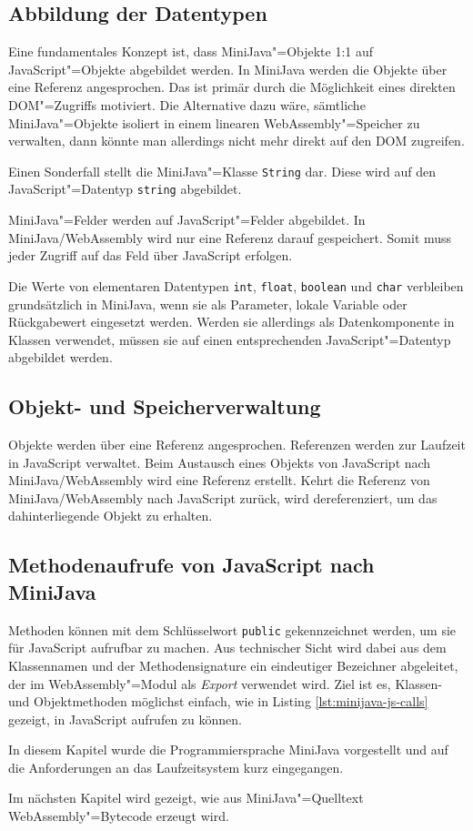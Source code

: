 \subsection{Abbildung der Datentypen}
Eine fundamentales Konzept ist, dass MiniJava"=Objekte 1:1 auf JavaScript"=Objekte abgebildet werden. In MiniJava werden die Objekte über eine Referenz angesprochen. Das ist primär durch die Möglichkeit eines direkten DOM"=Zugriffs motiviert. Die Alternative dazu wäre, sämtliche MiniJava"=Objekte isoliert in einem linearen WebAssembly"=Speicher zu verwalten, dann könnte man allerdings nicht mehr direkt auf den DOM zugreifen.

Einen Sonderfall stellt die MiniJava"=Klasse \lstinline{String} dar. Diese wird auf den JavaScript"=Datentyp \lstinline{string} abgebildet.

MiniJava"=Felder werden auf JavaScript"=Felder abgebildet. In MiniJava/WebAssembly wird nur eine Referenz darauf gespeichert. Somit muss jeder Zugriff auf das Feld über JavaScript erfolgen.

Die Werte von elementaren Datentypen \lstinline{int}, \lstinline{float}, \lstinline{boolean} und \lstinline{char} verbleiben grundsätzlich in MiniJava, wenn sie als Parameter, lokale Variable oder Rückgabewert eingesetzt werden. Werden sie allerdings als Datenkomponente in Klassen verwendet, müssen sie auf einen entsprechenden JavaScript"=Datentyp abgebildet werden.

\subsection{Objekt- und Speicherverwaltung}
Objekte werden über eine Referenz angesprochen. Referenzen werden zur Laufzeit in JavaScript verwaltet. Beim Austausch eines Objekts von JavaScript nach MiniJava/WebAssembly wird eine Referenz erstellt. Kehrt die Referenz von MiniJava/WebAssembly nach JavaScript zurück, wird dereferenziert, um das dahinterliegende Objekt zu erhalten.

\subsection{Methodenaufrufe von JavaScript nach MiniJava}
Methoden können mit dem Schlüsselwort \lstinline{public} gekennzeichnet werden, um sie für JavaScript aufrufbar zu machen. Aus technischer Sicht wird dabei aus dem Klassennamen und der Methodensignature ein eindeutiger Bezeichner abgeleitet, der im WebAssembly"=Modul als \emph{Export} verwendet wird. Ziel ist es, Klassen- und Objektmethoden möglichst einfach, wie in Listing \ref{lst:minijava-js-calls} gezeigt, in JavaScript aufrufen zu können.

\pagebreak


\vspace{4em}
In diesem Kapitel wurde die Programmiersprache MiniJava vorgestellt und auf die Anforderungen an das Laufzeitsystem kurz eingegangen.

Im nächsten Kapitel wird gezeigt, wie aus MiniJava"=Quelltext WebAssembly"=Bytecode erzeugt wird.
